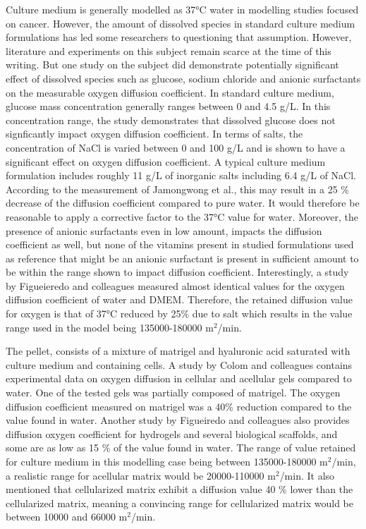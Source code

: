 \documentclass[11pt,a4paper]{article}
\begin{document}
Culture medium is generally modelled as 37°C water in modelling studies focused on cancer.\cite{Mao2018}\cite{Kempf2005}\cite{Bull2020}\cite{Jagiella2016} However, the amount of dissolved species in standard culture medium formulations has led some researchers to questioning that assumption. However, literature and experiments on this subject remain scarce at the time of this writing. But one study on the subject did demonstrate potentially significant effect of dissolved species such as glucose, sodium chloride and anionic surfactants on the measurable oxygen diffusion coefficient.\cite{Jamongwong2010} In standard culture medium, glucose mass concentration generally ranges between 0 and 4.5 g/L. In this concentration range, the study demonstrates that dissolved glucose does not signficantly impact oxygen diffusion coefficient. In terms of salts, the concentration of NaCl is varied between 0 and 100  g/L and is shown to have a significant effect on oxygen diffusion coefficient. A typical culture medium formulation includes roughly 11 g/L of inorganic salts including 6.4 g/L of NaCl. According to the measurement of Jamongwong et al., this may result in a 25 \% decrease of the diffusion coefficient compared to pure water. It would therefore be reasonable to apply a corrective factor to the 37°C value for water. Moreover, the presence of anionic surfactants even in low amount, impacts the diffusion coefficient as well, but none of the vitamins present in studied formulations used as reference that might be an anionic surfactant is present in sufficient amount to be within the range shown to impact diffusion coefficient. Interestingly, a study by Figueieredo and colleagues measured almost identical values for the oxygen diffusion coefficient of water and DMEM.\cite{Figueiredo2018} Therefore, the retained diffusion value for oxygen is that of 37°C reduced by 25\% due to salt which results in the value range used in the model being 135000-180000 \textmu m$^2$/min.

The pellet, consists of a mixture of matrigel and hyaluronic acid saturated with culture medium and containing cells. A study by Colom and colleagues contains experimental data on oxygen diffusion in cellular and acellular gels compared to water.\cite{Colom2014} One of the tested gels was partially composed of matrigel. The oxygen diffusion coefficient measured on matrigel was a 40\% reduction compared to the value found in water. Another study by Figueiredo and colleagues also provides diffusion oxygen coefficient for hydrogels and several biological scaffolds, and some are as low as 15 \% of the value found in water.\cite{Figueiredo2018} The range of value retained for culture medium in this modelling case being between 135000-180000 \textmu m$^2$/min, a realistic range for acellular matrix would be 20000-110000 \textmu m$^2$/min. It also mentioned that cellularized matrix exhibit a diffusion value 40 \% lower than the cellularized matrix, meaning a convincing range for cellularized matrix would be between 10000 and 66000 \textmu m$^2$/min.
\end{document}
